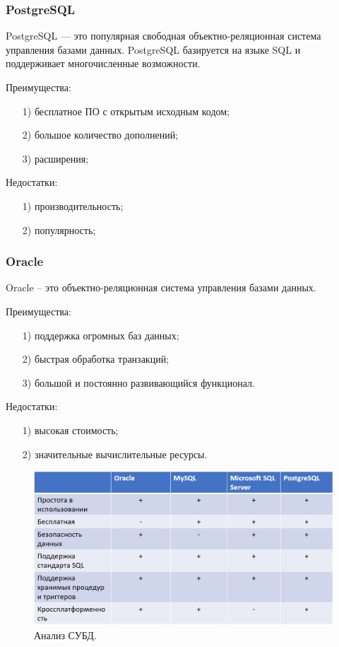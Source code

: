 \subsubsection{PostgreSQL}
PostgreSQL — это популярная свободная объектно-реляционная система управления базами данных. PostgreSQL базируется на языке SQL и поддерживает многочисленные возможности.

Преимущества:
\begin{itemize}
	\item[1)] бесплатное ПО с открытым исходным кодом;
	\item[2)] большое количество дополнений;
	\item[3)] расширения;   
\end{itemize}
Недостатки:
\begin{itemize}
	\item[1)] производительность;
	\item[2)] популярность;  
\end{itemize}
\subsubsection{Oracle}
Oracle – это объектно-реляционная система управления базами данных.

Преимущества:
\begin{itemize}
	\item[1)] поддержка огромных баз данных;
	\item[2)] быстрая обработка транзакций;
	\item[3)] большой и постоянно развивающийся функционал.   
\end{itemize}
Недостатки:
\begin{itemize}
	\item[1)] высокая стоимость; 
	\item[2)] значительные вычислительные ресурсы. 
\end{itemize}

\begin{figure}[h!]
	\centering
	\includegraphics[scale=0.6]{img/subd.jpg}
	\caption{Анализ СУБД.}
	\label{img:subd}
\end{figure}

